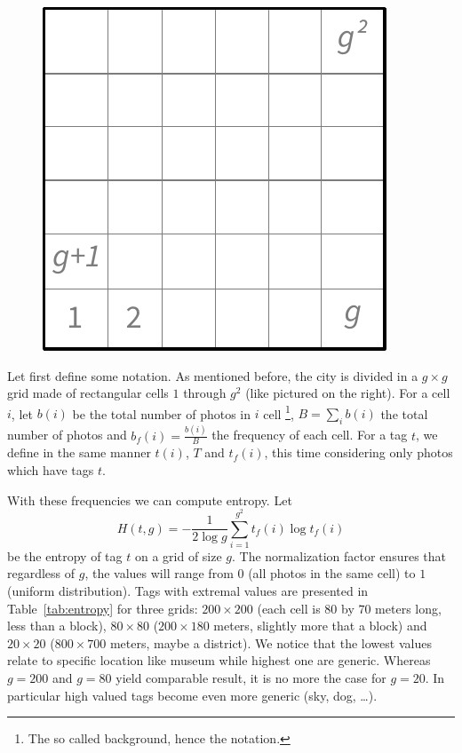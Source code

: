 \begin{figure}
\centering
\vspace{-.6\baselineskip}
\includegraphics[width=0.15\columnwidth]{grid}
\end{figure}
Let first define some notation. As mentioned before, the city is divided in a
$g\times g$ grid made of rectangular cells $1$ through $g^2$ (like pictured on
the right). For a cell $i$, let $b(i)$ be the total number of photos in
$i$ cell \footnote{The so called background, hence the notation.},
$B=\sum_i b(i)$ the total number of photos and $b_f(i)=\frac{b(i)}{B}$ the
frequency of each cell. For a tag $t$, we define in the same manner $t(i)$,
$T$ and $t_f(i)$, this time considering only photos which have tags $t$.

With these frequencies we can compute entropy. Let \[H(t,g) = -\frac{1}{2\log
g}\sum_{i=1}^{g^2} t_f(i)\log t_f(i)\] be the entropy of tag $t$ on a grid of
size $g$. The normalization factor ensures that regardless of $g$, the values
will range from $0$ (all photos in the same cell) to $1$ (uniform
distribution). Tags with extremal values are presented in
Table~\vref{tab:entropy} for three grids: $200\times 200$ (each cell is $80$
by $70$ meters long, less than a block), $80\times 80$ ($200\times 180$
meters, slightly more that a block) and $20\times 20$ ($800\times 700$ meters,
maybe a district). We notice that the lowest values relate to specific
location like museum while highest one are generic. Whereas $g=200$ and
$g=80$ yield comparable result, it is no more the case for $g=20$. In
particular high valued tags become even more generic (sky, dog, \dots).

